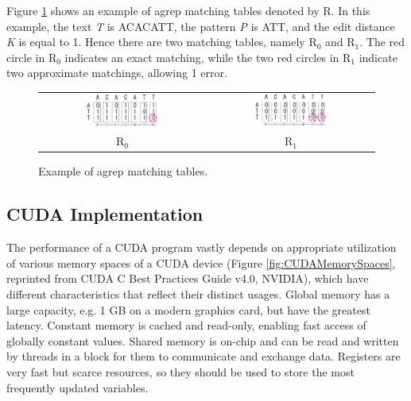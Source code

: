 Figure \ref{fig:AgrepMatchingTables} shows an example of agrep matching tables denoted by R. In this example, the text \textit{T} is ACACATT, the pattern \textit{P} is ATT, and the edit distance \textit{K} is equal to 1. Hence there are two matching tables, namely R$_0$ and R$_1$. The red circle in R$_0$ indicates an exact matching, while the two red circles in R$_1$ indicate two approximate matchings, allowing 1 error.

\begin{figure}
\centering
\begin{tabular} {cc}
 \includegraphics[width=0.45\textwidth]{SequenceMatching/Figures/AgrepMatchingTableR0.eps} &
 \includegraphics[width=0.45\textwidth]{SequenceMatching/Figures/AgrepMatchingTableR1.eps}\\
 R$_0$ & R$_1$ \\
\end{tabular}
\caption{Example of agrep matching tables.}
\label{fig:AgrepMatchingTables}
\end{figure}

\subsection{CUDA Implementation}

The performance of a CUDA program vastly depends on appropriate utilization of various memory spaces of a CUDA device (Figure \ref{fig:CUDAMemorySpaces}, reprinted from CUDA C Best Practices Guide v4.0, NVIDIA), which have different characteristics that reflect their distinct usages. Global memory has a large capacity, e.g. 1 GB on a modern graphics card, but have the greatest latency. Constant memory is cached and read-only, enabling fast access of globally constant values. Shared memory is on-chip and can be read and written by threads in a block for them to communicate and exchange data. Registers are very fast but scarce resources, so they should be used to store the most frequently updated variables.

